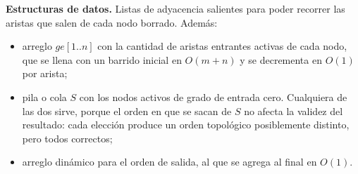\documentclass[12pt, spanish, oneside, openany]{book}
\newenvironment{estructuras}%
  {\begin{center}\begin{minipage}{0.93\textwidth}\begin{mdframed}[style=estrbox]%
   \small\textbf{Estructuras de datos.}\;}%
  {\end{mdframed}\end{minipage}\end{center}}
\theoremstyle{uprightplain}
\theoremstyle{definition}
\theoremstyle{remark}
\theoremstyle{definition}
\begin{document}
\begin{estructuras}
Listas de adyacencia salientes para poder recorrer las aristas que salen
de cada nodo borrado. Además:

\begin{itemize}
    \item arreglo $\mathit{ge}[1..n]$ con la cantidad de aristas
    entrantes activas de cada nodo, que se llena con un barrido inicial en
    $O(m+n)$ y se decrementa en $O(1)$ por arista;
    \item pila o cola $S$ con los nodos activos de grado de entrada
    cero. Cualquiera de las dos sirve, porque el orden en que se sacan de $S$ no
    afecta la validez del resultado: cada elección produce un orden topológico
    posiblemente distinto, pero todos correctos;
    \item arreglo dinámico para el orden de salida, al que se agrega al
    final en $O(1)$.
\end{itemize}
\end{estructuras}
\end{document}
